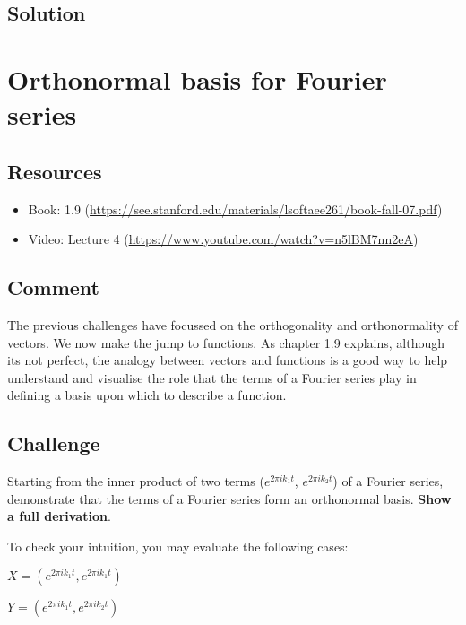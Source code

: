 \subsection*{Solution}
\six{}


\timebox




\newpage
\section{Orthonormal basis for Fourier series}

\subsection*{Resources}
\begin{itemize}
    \item Book: 1.9 (\url{https://see.stanford.edu/materials/lsoftaee261/book-fall-07.pdf})
    \item Video: Lecture 4 (\url{https://www.youtube.com/watch?v=n5lBM7nn2eA})
\end{itemize}

\subsection*{Comment}
The previous challenges have focussed on the orthogonality and orthonormality of vectors. We now make the jump to functions. As chapter 1.9 explains, although its not perfect, the analogy between vectors and functions is a good way to help understand and visualise the role that the terms of a Fourier series play in defining a basis upon which to describe a function.

\subsection*{Challenge}
Starting from the inner product of two terms ($e^{2 \pi i k_1 t}$, $e^{2 \pi i k_2 t}$) of a Fourier series, demonstrate that the terms of a Fourier series form an orthonormal basis. \textbf{Show a full derivation}.

To check your intuition, you may evaluate the following cases:

$X = (e^{2 \pi i k_1 t}, e^{2 \pi i k_1 t})$

$Y = (e^{2 \pi i k_1 t}, e^{2 \pi i k_2 t})$

